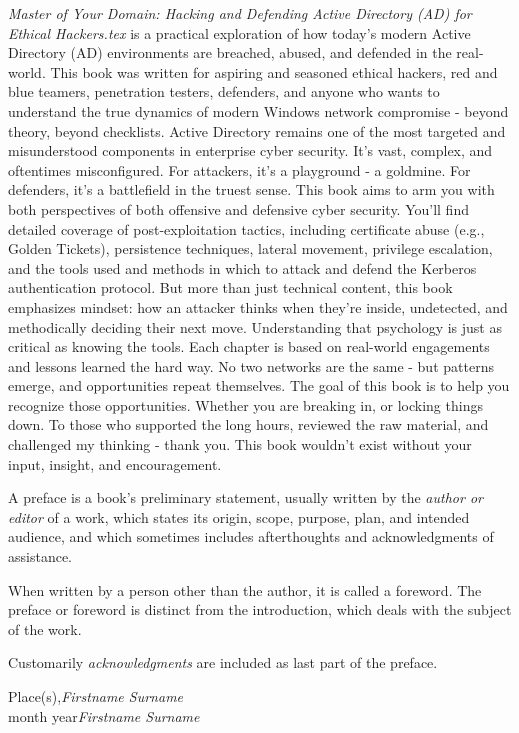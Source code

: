 %
%

\preface

\emph{Master of Your Domain: Hacking and Defending Active Directory (AD) for Ethical Hackers.tex} is a practical exploration of how today's modern Active Directory (AD) environments are breached, abused, and defended in the real-world. This book was written for aspiring and seasoned ethical hackers, red and blue teamers, penetration testers, defenders, and anyone who wants to understand the true dynamics of modern Windows network compromise - beyond theory, beyond checklists.
Active Directory remains one of the most targeted and misunderstood components in enterprise cyber security. It's vast, complex, and oftentimes misconfigured. For attackers, it's a playground - a goldmine. For defenders, it's a battlefield in the truest sense. This book aims to arm you with both perspectives of both offensive and defensive cyber security. You'll find detailed coverage of post-exploitation tactics, including certificate abuse (e.g., Golden Tickets), persistence techniques, lateral movement, privilege escalation, and the tools used and methods in which to attack and defend the Kerberos authentication protocol. But more than just technical content, this book emphasizes mindset: how an attacker thinks when they're inside, undetected, and methodically deciding their next move. Understanding that psychology is just as critical as knowing the tools.
Each chapter is based on real-world engagements and lessons learned the hard way. No two networks are the same - but patterns emerge, and opportunities repeat themselves. The goal of this book is to help you recognize those opportunities. Whether you are breaking in, or locking things down.
To those who supported the long hours, reviewed the raw material, and challenged my thinking - thank you. This book wouldn't exist without your input, insight, and encouragement.


A preface is a book's preliminary statement, usually written by the \textit{author or editor} of a work, which states its origin, scope, purpose, plan, and intended audience, and which sometimes includes afterthoughts and acknowledgments of assistance. 

When written by a person other than the author, it is called a foreword. The preface or foreword is distinct from the introduction, which deals with the subject of the work.

Customarily \textit{acknowledgments} are included as last part of the preface.
 

\vspace{\baselineskip}
\begin{flushright}\noindent
Place(s),\hfill {\it Firstname  Surname}\\
month year\hfill {\it Firstname  Surname}\\
\end{flushright}


